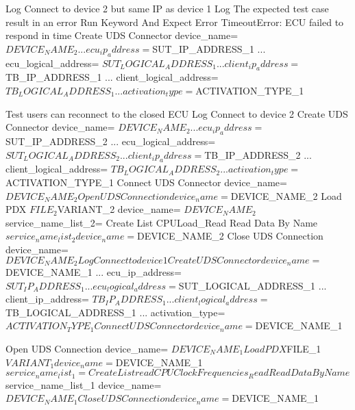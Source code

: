 \begin{robotcode}
    Log    Connect to device 2 but same IP as device 1
    Log    The expected test case result in an error
    Run Keyword And Expect Error    TimeoutError: ECU failed to respond in time    Create UDS Connector    device_name= ${DEVICE_NAME_2}
    ...                                                                                                    ecu_ip_address= ${SUT_IP_ADDRESS_1}
    ...                                                                                                    ecu_logical_address= ${SUT_LOGICAL_ADDRESS_1}
    ...                                                                                                    client_ip_address= ${TB_IP_ADDRESS_1}
    ...                                                                                                    client_logical_address= ${TB_LOGICAL_ADDRESS_1}
    ...                                                                                                    activation_type= ${ACTIVATION_TYPE_1}

Test users can reconnect to the closed ECU
    Log    Connect to device 2
    Create UDS Connector    device_name= ${DEVICE_NAME_2}
    ...                     ecu_ip_address= ${SUT_IP_ADDRESS_2}
    ...                     ecu_logical_address= ${SUT_LOGICAL_ADDRESS_2}
    ...                     client_ip_address= ${TB_IP_ADDRESS_2}
    ...                     client_logical_address= ${TB_LOGICAL_ADDRESS_2}
    ...                     activation_type= ${ACTIVATION_TYPE_1}
    Connect UDS Connector    device_name= ${DEVICE_NAME_2}

    Open UDS Connection    device_name= ${DEVICE_NAME_2}
    Load PDX    ${FILE_2}    ${VARIANT_2}    device_name= ${DEVICE_NAME_2}
    ${service_name_list_2}=    Create List    CPULoad_Read
    Read Data By Name    ${service_name_list_2}    device_name= ${DEVICE_NAME_2}
    Close UDS Connection    device_name= ${DEVICE_NAME_2}

    Log    Connect to device 1
    Create UDS Connector    device_name= ${DEVICE_NAME_1}
    ...                     ecu_ip_address= ${SUT_IP_ADDRESS_1}
    ...                     ecu_logical_address= ${SUT_LOGICAL_ADDRESS_1}
    ...                     client_ip_address= ${TB_IP_ADDRESS_1}
    ...                     client_logical_address= ${TB_LOGICAL_ADDRESS_1}
    ...                     activation_type= ${ACTIVATION_TYPE_1}
    Connect UDS Connector    device_name= ${DEVICE_NAME_1}

    Open UDS Connection    device_name= ${DEVICE_NAME_1}
    Load PDX    ${FILE_1}    ${VARIANT_1}    device_name= ${DEVICE_NAME_1}
    ${service_name_list_1}=    Create List    readCPUClockFrequencies_Read
    Read Data By Name    ${service_name_list_1}    device_name= ${DEVICE_NAME_1}
    Close UDS Connection    device_name= ${DEVICE_NAME_1}



\end{robotcode}
